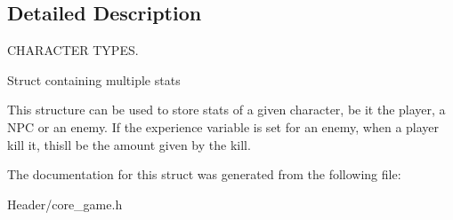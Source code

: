 \subsection{Detailed Description}
C\+H\+A\+R\+A\+C\+T\+ER T\+Y\+P\+ES. 

Struct containing multiple stats

This structure can be used to store stats of a given character, be it the player, a N\+PC or an enemy. If the experience variable is set for an enemy, when a player kill it, this\textquotesingle{}ll be the amount given by the kill. 

The documentation for this struct was generated from the following file\+:\begin{DoxyCompactItemize}
\item 
Header/core\+\_\+game.\+h\end{DoxyCompactItemize}

